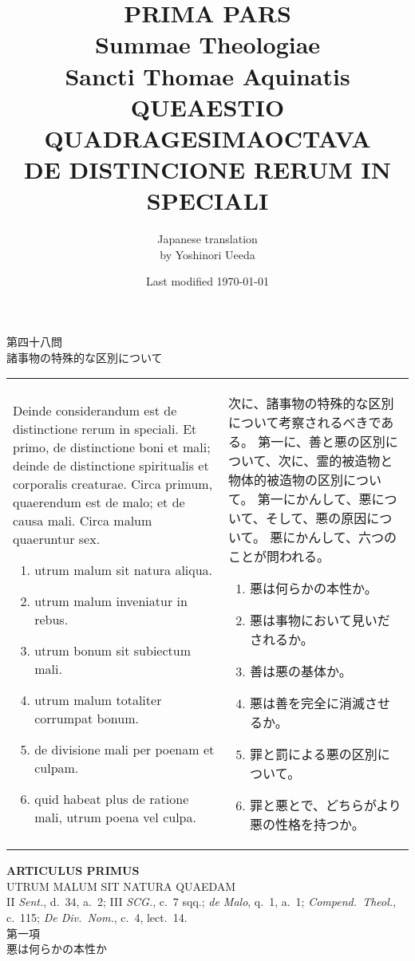 \documentclass[10pt]{jsarticle} %
\title{{\bf PRIMA PARS}\\{\HUGE Summae Theologiae}\\Sancti Thomae
Aquinatis\\{\sffamily QUEAESTIO QUADRAGESIMAOCTAVA}\\DE DISTINCIONE RERUM IN SPECIALI}
\author{Japanese translation\\by Yoshinori {\sc Ueeda}}
\date{Last modified \today}
\begin{document}
\maketitle

\begin{center}
{\Large 第四十八問\\
諸事物の特殊的な区別について}
\end{center}

\begin{longtable}{p{21em}p{21em}}

Deinde considerandum est de distinctione rerum in speciali. Et primo, de
distinctione boni et mali; deinde de distinctione spiritualis et
corporalis creaturae. Circa primum, quaerendum est de malo; et de causa
mali. Circa malum quaeruntur sex. 

\begin{enumerate}
 \item utrum malum sit natura aliqua. 
 \item utrum malum inveniatur in rebus.
 \item utrum bonum sit subiectum mali.
 \item utrum malum totaliter corrumpat bonum.
 \item de divisione mali per poenam et culpam.
 \item quid habeat plus de ratione mali, utrum poena vel culpa.
\end{enumerate}

&

次に、諸事物の特殊的な区別について考察されるべきである。
第一に、善と悪の区別について、次に、霊的被造物と物体的被造物の区別について。
第一にかんして、悪について、そして、悪の原因について。
悪にかんして、六つのことが問われる。

\begin{enumerate}
 \item 悪は何らかの本性か。
 \item 悪は事物において見いだされるか。
 \item 善は悪の基体か。
 \item 悪は善を完全に消滅させるか。
 \item 罪と罰による悪の区別について。
 \item 罪と悪とで、どちらがより悪の性格を持つか。
\end{enumerate}

\end{longtable}
\newpage

\begin{center}
 {\Large {\bf ARTICULUS PRIMUS}}\\
 {\large UTRUM MALUM SIT NATURA QUAEDAM}\\
 {\footnotesize II {\itshape Sent.}, d.~34, a.~2; III {\itshape SCG.}, c.~7 sqq.; {\itshape de Malo}, q.~1, a.~1; {\itshape Compend.~Theol.}, c.~115; {\itshape De Div.~Nom.}, c.~4, lect.~14.}\\
 {\Large 第一項\\悪は何らかの本性か}
\end{center}
\end{document}
